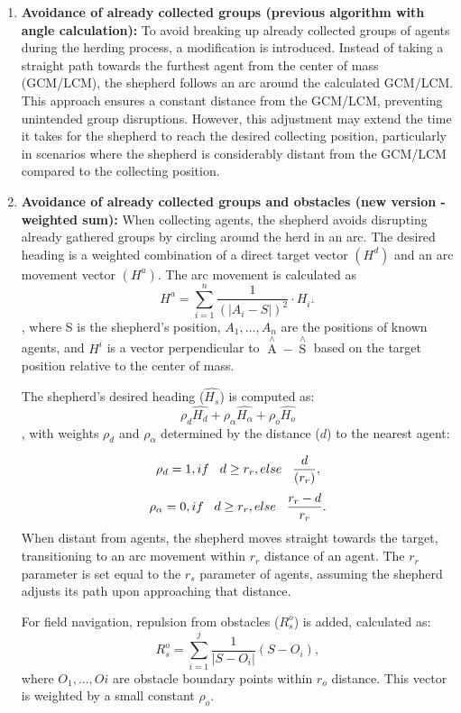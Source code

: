 \documentclass[9pt]{pnas-new}
\begin{document}
\begin{enumerate}
    \item \textbf{Avoidance of already collected groups (previous algorithm with angle calculation):}
    To avoid breaking up already collected groups of agents during the herding process, a modification is introduced. Instead of taking a straight path towards the furthest agent from the center of mass (GCM/LCM), the shepherd follows an arc around the calculated GCM/LCM. This approach ensures a constant distance from the GCM/LCM, preventing unintended group disruptions. However, this adjustment may extend the time it takes for the shepherd to reach the desired collecting position, particularly in scenarios where the shepherd is considerably distant from the GCM/LCM compared to the collecting position.
    \item \textbf{Avoidance of already collected groups and obstacles (new version - weighted sum):}
    When collecting agents, the shepherd avoids disrupting already gathered groups by circling around the herd in an arc. The desired heading is a weighted combination of a direct target vector $(H^d)$ and an arc movement vector $(H^a)$. The arc movement is calculated as $$H^a = \sum^n_{i=1}\frac{1}{(|A_i - S|)^2} \cdot H_{i^\bot}$$, where S is the shepherd's position, $A_1,\dots, A_n$ are the positions of known agents, and $H^i$ is a vector perpendicular to $\mathop{A{}}\limits^\wedge -\mathop{S{}}\limits^\wedge$ based on the target position relative to the center of mass.
    
The shepherd's desired heading ($\hat{H_s}$) is computed as: $$\rho_d\hat{H{_d}} + \rho_\alpha\hat{H{_\alpha}} + \rho_o\hat{H_o}$$, with weights $\rho_d$ and $\rho_\alpha$ determined by the distance ($d$) to the nearest agent:

$$\rho_d = 1, if \hspace{0,3cm} d \geq r_r, else \hspace{0,3cm}  \frac{d}{(r_r)},$$
$$\rho_\alpha = 0, if \hspace{0,3cm} d \geq r_r, else \hspace{0,3cm} \frac{r_r - d}{r_r}.$$
When distant from agents, the shepherd moves straight towards the target, transitioning to an arc movement within $r_r$ distance of an agent. The $r_r$ parameter is set equal to the $r_s$ parameter of agents, assuming the shepherd adjusts its path upon approaching that distance.

For field navigation, repulsion from obstacles ($R^o_s$) is added, calculated as: $$R^o_s =  \sum^j_{i=1}{\frac{1}{|S - O_i|}(S - O_i)},$$ where $O_1, ..., Oi$ are obstacle boundary points within $r_o$ distance. This vector is weighted by a small constant $\rho_o$.
\end{enumerate}
\end{document}
